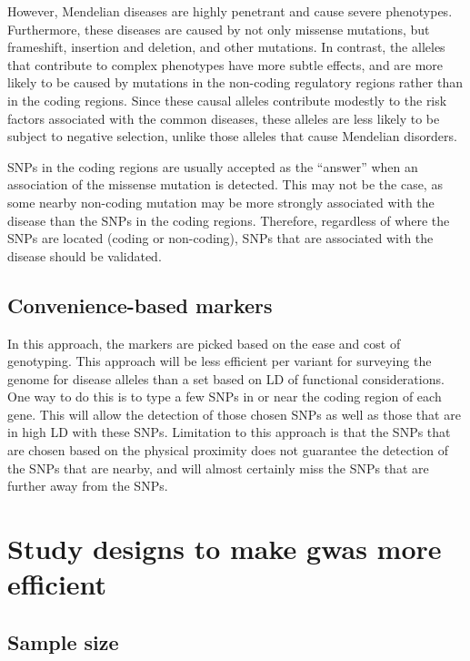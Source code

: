 However, Mendelian diseases are highly penetrant and cause severe phenotypes.
Furthermore, these diseases are caused by not only missense mutations, but frameshift, insertion and deletion, and other mutations.
In contrast, the alleles that contribute to complex phenotypes have more subtle effects, and are more likely to be caused by mutations in the non-coding regulatory regions rather than in the coding regions.
Since these causal alleles contribute modestly to the risk factors associated with the common diseases, these alleles are less likely to be subject to negative selection, unlike those alleles that cause Mendelian disorders.

SNPs in the coding regions are usually accepted as the ``answer'' when an association of the missense mutation is detected.
This may not be the case, as some nearby non-coding mutation may be more strongly associated with the disease than the SNPs in the  coding regions.
Therefore, regardless of where the SNPs are located (coding or non-coding), SNPs that are associated with the disease should be validated.

\subsection{Convenience-based markers}
\label{sub:convenience_based_markers}

In this approach, the markers are picked based on the ease and cost of genotyping.
This approach will be less efficient per variant for surveying the genome for disease alleles than a set based on LD of functional considerations.
One way to do this is to type a few SNPs in or near the coding region of each gene.
This will allow the detection of those chosen SNPs as well as those that are in high LD with these SNPs.
Limitation to this approach is that the SNPs that are chosen based on the physical proximity does not guarantee the detection of the SNPs that are nearby, and will almost certainly miss the SNPs that are further away from the SNPs.

\section{Study designs to make \gls{gwas} more efficient}
\label{sec:study_designs_to_make_gwas_more_efficient}

\subsection{Sample size}
\label{sub:sample_size}

